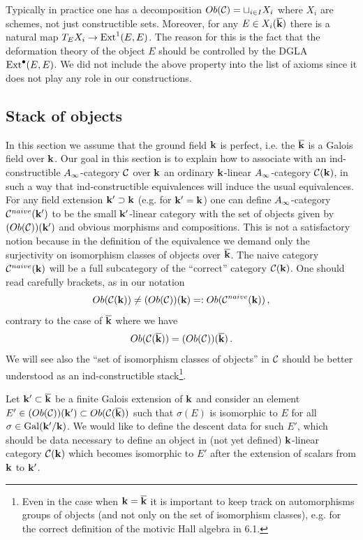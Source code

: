 \documentclass[12pt]{article}
\begin{document}
\begin{rmk} Typically in practice one has a decomposition $Ob({\mathcal C})=\sqcup_{i\in I}X_i$ where $X_i$ are schemes, not just constructible sets. Moreover, for any $E\in X_i({\overline{\bf k}})$ there is a natural map $T_E X_i\to \operatorname{Ext}^1(E,E)$. The reason for this is the fact that the deformation theory of the object $E$ should be controlled by the DGLA $\operatorname{Ext}^{\bullet}(E,E)$. We did not include the above property into the list of axioms since it does not play any role in our constructions.
\end{rmk}



\subsection{Stack of objects}

In this section we assume that the ground field ${\bf k}$ is perfect, i.e. the ${\overline{\bf k}}$ is a Galois field over ${\bf k}$.
Our goal in this section is to explain how to associate with an 
ind-constructible $A_{\infty}$-category ${\mathcal C}$ over ${\bf k}$ an ordinary ${\bf k}$-linear $A_{\infty}$-category ${\mathcal C}({\bf k})$, in such a way
 that ind-constructible equivalences will induce the usual equivalences.
For any field extension ${\bf k}'\supset {\bf k}$ (e.g. for ${\bf k}'={\bf k}$) one can define $A_{\infty}$-category ${\mathcal C}^{naive}({\bf k}')$
to be the small ${\bf k}'$-linear category with the set of objects given by $(Ob({\mathcal C}))({\bf k}')$ and obvious morphisms and compositions.
This is not a satisfactory notion because
 in the definition of the equivalence we demand only the surjectivity on isomorphism classes of objects  over ${\overline{\bf k}}$.
The naive category ${\mathcal C}^{naive}({\bf k})$ will be a full subcategory of the ``correct'' category ${\mathcal C}({\bf k})$.
 One should read carefully brackets, as in our notation
 $$Ob({\mathcal C}({\bf k}))\ne (Ob({\mathcal C}))({\bf k})=:Ob({\mathcal C}^{naive}({\bf k}))\,,$$
contrary to the case of ${\overline{\bf k}}$ where we have 
 $$Ob({\mathcal C}({\overline{\bf k}}))=(Ob({\mathcal C}))({\overline{\bf k}})\,.$$
We will see also the ``set of isomorphism classes of objects'' in ${\mathcal C}$ should be better understood as an ind-constructible stack\footnote{Even in the case when ${\bf k}={\overline{\bf k}}$ it is important to keep track on automorphisms groups of objects (and not only on the set of isomorphism classes), e.g. for the correct definition of the motivic Hall algebra in 6.1.}.

Let ${\bf k}'\subset {\overline{\bf k}}$ be a finite Galois extension of ${\bf k}$ and consider an element $E'\in (Ob({\mathcal C}))({\bf k}')\subset Ob({\mathcal C}({\overline{\bf k}}))$ such that $\sigma(E)$ is isomorphic to 
$E$ for all $\sigma \in \operatorname{Gal}({\bf k}'/{\bf k})$. We would like to define the descent data for such $E'$, which should be data necessary to define
an object
in (not yet defined) ${\bf k}$-linear category ${\mathcal C}({\bf k})$ which becomes isomorphic to $E'$ after the extension of scalars from ${\bf k}$ to ${\bf k}'$.
\end{document}
